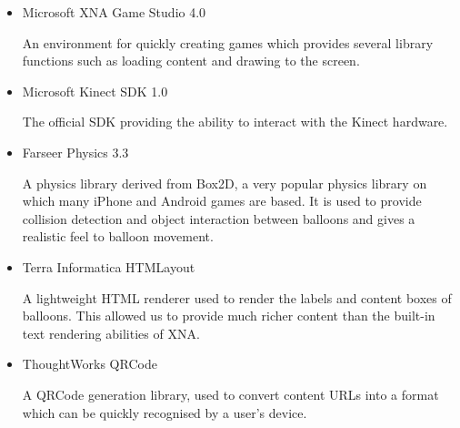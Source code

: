 \begin{itemize}
\item{Microsoft XNA Game Studio 4.0}

An environment for quickly creating games which provides several library 
functions such as loading content and drawing to the screen. 
\item{Microsoft Kinect SDK 1.0}

The official SDK providing the ability to interact with the Kinect hardware. 
\item{Farseer Physics 3.3}

A physics library derived from Box2D, a very popular physics library on which
many iPhone and Android games are based. It is used to provide collision 
detection and object interaction between balloons and gives a realistic feel to
balloon movement.
\item{Terra Informatica HTMLayout}

A lightweight HTML renderer used to render the labels and content boxes of 
balloons. This allowed us to provide much richer content than the built-in text
rendering abilities of XNA.
\item{ThoughtWorks QRCode}

A QRCode generation library, used to convert content URLs into a format which 
can be quickly recognised by a user's device.
\end{itemize}
